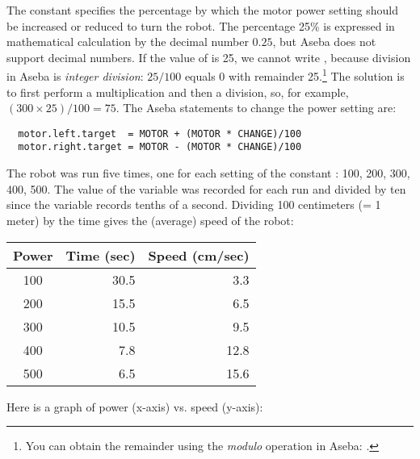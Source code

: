 The constant  specifies the percentage by which the motor
power setting  should be increased or reduced to turn the
robot. The percentage 25\% is expressed in mathematical calculation by
the decimal number $0.25$, but Aseba does not support decimal numbers.
If the value of  is 25, we cannot write ,
because division in Aseba is \emph{integer division}: $25/100$ equals 0
with remainder 25.\footnote{You can obtain the remainder using the
\emph{modulo} operation in Aseba: .} The solution is to
first perform a multiplication and then a division, so, for example,
$(300\times 25)/100 = 75$. The Aseba statements to change the power
setting are:

\begin{verbatim}
  motor.left.target  = MOTOR + (MOTOR * CHANGE)/100
  motor.right.target = MOTOR - (MOTOR * CHANGE)/100
\end{verbatim}



The robot was run five times, one for each setting of the constant : 100, 200, 300,
400, 500. The value of the variable  was recorded for each run
and divided by ten since the variable records tenths of a second.
Dividing 100 centimeters (= 1 meter) by the time gives the (average)
speed of the robot:

\begin{center}\label{tab.speed}
\begin{tabular}{|c|r|r|}\hline
Power  & Time (sec)  &Speed (cm/sec)\\\hline
100&30.5  &3.3\\\hline
200&15.5  &6.5\\\hline
300&10.5  &9.5\\\hline
400&7.8   &12.8\\\hline
500&6.5   &15.6\\\hline
\end{tabular}
\end{center}

Here is a graph of power (x-axis) vs. speed (y-axis):


